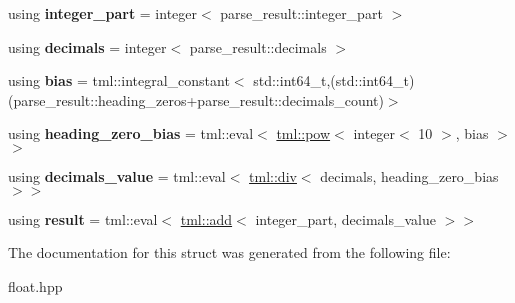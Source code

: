 \begin{DoxyCompactItemize}
\item 
\hypertarget{structtml_1_1floating_1_1impl_1_1parse__float_a62fa2ec7fbce4f8f974b5731b6fb55eb}{using {\bfseries integer\+\_\+part} = integer$<$ parse\+\_\+result\+::integer\+\_\+part $>$}\label{structtml_1_1floating_1_1impl_1_1parse__float_a62fa2ec7fbce4f8f974b5731b6fb55eb}

\item 
\hypertarget{structtml_1_1floating_1_1impl_1_1parse__float_acb8bb1c74d235b503fb10638a9a8f825}{using {\bfseries decimals} = integer$<$ parse\+\_\+result\+::decimals $>$}\label{structtml_1_1floating_1_1impl_1_1parse__float_acb8bb1c74d235b503fb10638a9a8f825}

\item 
\hypertarget{structtml_1_1floating_1_1impl_1_1parse__float_abebfb81054e378d1baa7e47f9c98984d}{using {\bfseries bias} = tml\+::integral\+\_\+constant$<$ std\+::int64\+\_\+t,(std\+::int64\+\_\+t)(parse\+\_\+result\+::heading\+\_\+zeros+parse\+\_\+result\+::decimals\+\_\+count)$>$}\label{structtml_1_1floating_1_1impl_1_1parse__float_abebfb81054e378d1baa7e47f9c98984d}

\item 
\hypertarget{structtml_1_1floating_1_1impl_1_1parse__float_a47b3aca0afa00a61a15eccc18bb4227f}{using {\bfseries heading\+\_\+zero\+\_\+bias} = tml\+::eval$<$ \hyperlink{structtml_1_1pow}{tml\+::pow}$<$ integer$<$ 10 $>$, bias $>$$>$}\label{structtml_1_1floating_1_1impl_1_1parse__float_a47b3aca0afa00a61a15eccc18bb4227f}

\item 
\hypertarget{structtml_1_1floating_1_1impl_1_1parse__float_a7a8c1c3093ef6f7f108ee001da8a305c}{using {\bfseries decimals\+\_\+value} = tml\+::eval$<$ \hyperlink{structtml_1_1div}{tml\+::div}$<$ decimals, heading\+\_\+zero\+\_\+bias $>$$>$}\label{structtml_1_1floating_1_1impl_1_1parse__float_a7a8c1c3093ef6f7f108ee001da8a305c}

\item 
\hypertarget{structtml_1_1floating_1_1impl_1_1parse__float_aee2735aec0ab24e0d972fc71da948adf}{using {\bfseries result} = tml\+::eval$<$ \hyperlink{structtml_1_1add}{tml\+::add}$<$ integer\+\_\+part, decimals\+\_\+value $>$$>$}\label{structtml_1_1floating_1_1impl_1_1parse__float_aee2735aec0ab24e0d972fc71da948adf}

\end{DoxyCompactItemize}


The documentation for this struct was generated from the following file\+:\begin{DoxyCompactItemize}
\item 
float.\+hpp\end{DoxyCompactItemize}
